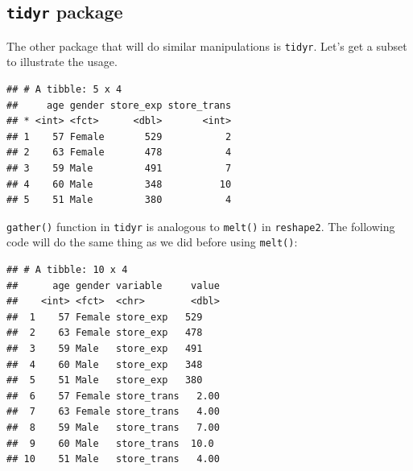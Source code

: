 \documentclass[12pt,]{krantz}
\newenvironment{Shaded}{\begin{snugshade}}{\end{snugshade}}
\newcommand{\KeywordTok}[1]{\textcolor[rgb]{0.13,0.29,0.53}{\textbf{#1}}}
\newcommand{\DecValTok}[1]{\textcolor[rgb]{0.00,0.00,0.81}{#1}}
\newcommand{\StringTok}[1]{\textcolor[rgb]{0.31,0.60,0.02}{#1}}
\newcommand{\CommentTok}[1]{\textcolor[rgb]{0.56,0.35,0.01}{\textit{#1}}}
\newcommand{\OperatorTok}[1]{\textcolor[rgb]{0.81,0.36,0.00}{\textbf{#1}}}
\newcommand{\NormalTok}[1]{#1}
\theoremstyle{definition}
\theoremstyle{definition}
\theoremstyle{definition}
\theoremstyle{remark}
\begin{document}
\subsection{\texorpdfstring{\texttt{tidyr}
package}{tidyr package}}\label{tidyr-package}

The other package that will do similar manipulations is \texttt{tidyr}.
Let's get a subset to illustrate the usage.

\begin{Shaded}
\end{Shaded}

\begin{verbatim}
## # A tibble: 5 x 4
##     age gender store_exp store_trans
## * <int> <fct>      <dbl>       <int>
## 1    57 Female       529           2
## 2    63 Female       478           4
## 3    59 Male         491           7
## 4    60 Male         348          10
## 5    51 Male         380           4
\end{verbatim}

\texttt{gather()} function in \texttt{tidyr} is analogous to
\texttt{melt()} in \texttt{reshape2}. The following code will do the
same thing as we did before using \texttt{melt()}:

\begin{Shaded}
\end{Shaded}

\begin{verbatim}
## # A tibble: 10 x 4
##      age gender variable     value
##    <int> <fct>  <chr>        <dbl>
##  1    57 Female store_exp   529   
##  2    63 Female store_exp   478   
##  3    59 Male   store_exp   491   
##  4    60 Male   store_exp   348   
##  5    51 Male   store_exp   380   
##  6    57 Female store_trans   2.00
##  7    63 Female store_trans   4.00
##  8    59 Male   store_trans   7.00
##  9    60 Male   store_trans  10.0 
## 10    51 Male   store_trans   4.00
\end{verbatim}
\end{document}
